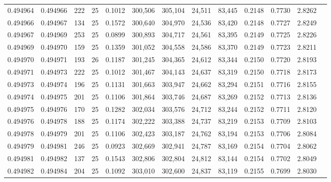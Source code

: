 \begin{tabular}{rrrrrrrrrrrrr}
0.494964 & 0.494966 &   222 &  25 &                                     0.1012 & 300,506 & 305,104 &  24,511 &  83,445 & 0.2148 & 0.7730 & 2.8262 \\
0.494966 & 0.494967 &   134 &  25 &                                     0.1572 & 300,640 & 304,970 &  24,536 &  83,420 & 0.2148 & 0.7727 & 2.8249 \\
0.494967 & 0.494969 &   253 &  25 &                                     0.0899 & 300,893 & 304,717 &  24,561 &  83,395 & 0.2149 & 0.7725 & 2.8226 \\
0.494969 & 0.494970 &   159 &  25 &                                     0.1359 & 301,052 & 304,558 &  24,586 &  83,370 & 0.2149 & 0.7723 & 2.8211 \\
0.494970 & 0.494971 &   193 &  26 &                                     0.1187 & 301,245 & 304,365 &  24,612 &  83,344 & 0.2150 & 0.7720 & 2.8193 \\
0.494971 & 0.494973 &   222 &  25 &                                     0.1012 & 301,467 & 304,143 &  24,637 &  83,319 & 0.2150 & 0.7718 & 2.8173 \\
0.494973 & 0.494974 &   196 &  25 &                                     0.1131 & 301,663 & 303,947 &  24,662 &  83,294 & 0.2151 & 0.7716 & 2.8155 \\
0.494974 & 0.494975 &   201 &  25 &                                     0.1106 & 301,864 & 303,746 &  24,687 &  83,269 & 0.2152 & 0.7713 & 2.8136 \\
0.494975 & 0.494976 &   170 &  25 &                                     0.1282 & 302,034 & 303,576 &  24,712 &  83,244 & 0.2152 & 0.7711 & 2.8120 \\
0.494976 & 0.494978 &   188 &  25 &                                     0.1174 & 302,222 & 303,388 &  24,737 &  83,219 & 0.2153 & 0.7709 & 2.8103 \\
0.494978 & 0.494979 &   201 &  25 &                                     0.1106 & 302,423 & 303,187 &  24,762 &  83,194 & 0.2153 & 0.7706 & 2.8084 \\
0.494979 & 0.494981 &   246 &  25 &                                     0.0923 & 302,669 & 302,941 &  24,787 &  83,169 & 0.2154 & 0.7704 & 2.8062 \\
0.494981 & 0.494982 &   137 &  25 &                                     0.1543 & 302,806 & 302,804 &  24,812 &  83,144 & 0.2154 & 0.7702 & 2.8049 \\
0.494982 & 0.494984 &   204 &  25 &                                     0.1092 & 303,010 & 302,600 &  24,837 &  83,119 & 0.2155 & 0.7699 & 2.8030 \\

\end{tabular}
